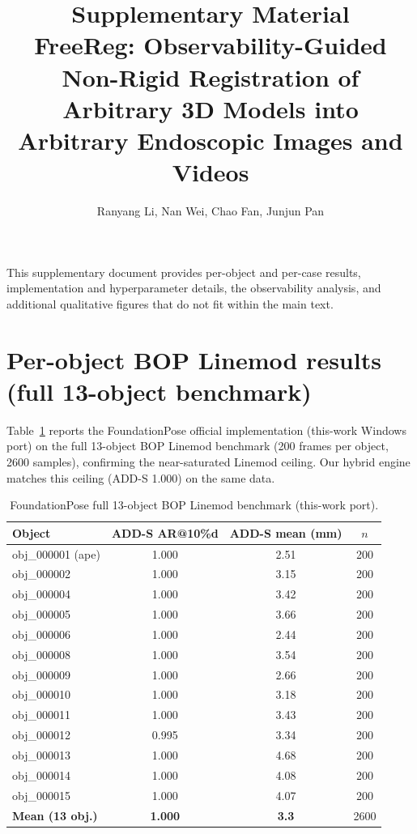 \documentclass[10pt]{article}
\title{Supplementary Material\\[0.3em]
\large FreeReg: Observability-Guided Non-Rigid Registration of Arbitrary 3D
Models into Arbitrary Endoscopic Images and Videos}
\author{Ranyang Li, Nan Wei, Chao Fan, Junjun Pan}
\date{}
\begin{document}
\maketitle

This supplementary document provides per-object and per-case results,
implementation and hyperparameter details, the observability analysis, and
additional qualitative figures that do not fit within the main text.

\section{Per-object BOP Linemod results (full 13-object benchmark)}
Table~\ref{tab:perobj} reports the FoundationPose official implementation
(this-work Windows port) on the full 13-object BOP Linemod benchmark (200
frames per object, 2600 samples), confirming the near-saturated Linemod
ceiling. Our hybrid engine matches this ceiling (ADD-S 1.000) on the same data.

\begin{table}[h]
\centering
\caption{FoundationPose full 13-object BOP Linemod benchmark (this-work port).}
\label{tab:perobj}
\begin{tabular}{lccc}
\toprule
Object & ADD-S AR@10\%d & ADD-S mean (mm) & $n$ \\
\midrule
obj\_000001 (ape) & 1.000 & 2.51 & 200 \\
obj\_000002 & 1.000 & 3.15 & 200 \\
obj\_000004 & 1.000 & 3.42 & 200 \\
obj\_000005 & 1.000 & 3.66 & 200 \\
obj\_000006 & 1.000 & 2.44 & 200 \\
obj\_000008 & 1.000 & 3.54 & 200 \\
obj\_000009 & 1.000 & 2.66 & 200 \\
obj\_000010 & 1.000 & 3.18 & 200 \\
obj\_000011 & 1.000 & 3.43 & 200 \\
obj\_000012 & 0.995 & 3.34 & 200 \\
obj\_000013 & 1.000 & 4.68 & 200 \\
obj\_000014 & 1.000 & 4.08 & 200 \\
obj\_000015 & 1.000 & 4.07 & 200 \\
\midrule
\textbf{Mean (13 obj.)} & \textbf{1.000} & \textbf{3.3} & 2600 \\
\bottomrule
\end{tabular}
\end{table}
\end{document}
